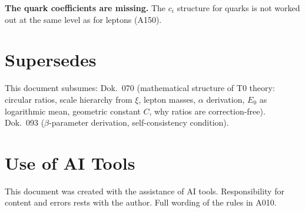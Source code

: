 \textbf{The quark coefficients are missing.} The $c_i$ structure for quarks is
not worked out at the same level as for leptons (A150).

\section{Supersedes}

This document subsumes: Dok.~070 (mathematical structure of T0 theory: circular
ratios, scale hierarchy from $\xi$, lepton masses, $\alpha$ derivation, $E_0$ as
logarithmic mean, geometric constant $C$, why ratios are correction-free).
Dok.~093 ($\beta$-parameter derivation, self-consistency condition).

\section{Use of AI Tools}

This document was created with the assistance of AI tools. Responsibility
for content and errors rests with the author. Full wording of the rules in A010.
